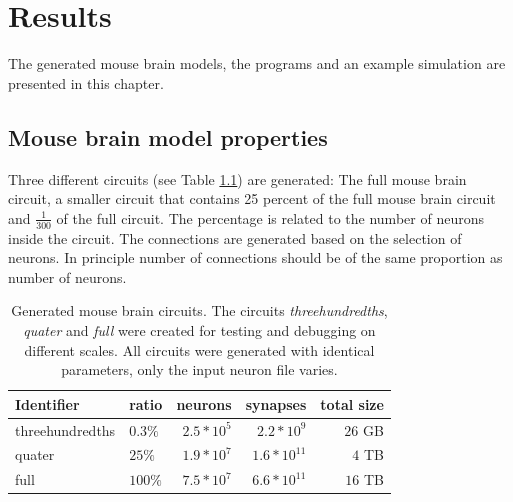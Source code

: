 %



\lstset{escapechar=@,style=customc}


\chapter{Results}

The generated mouse brain models, the programs and an example simulation are presented in this chapter.

\section{Mouse brain model properties}
Three different circuits (see Table \ref{table:circuits}) are generated: The full mouse brain circuit,
a smaller circuit that contains 25 percent of the full mouse brain circuit and
$\frac{1}{300}$ of the full circuit. The percentage is related to the number of neurons inside
the circuit. The connections are generated based on the selection of neurons. In principle
number of connections should be of the same proportion as number of neurons.

\begin{table}[ht!]
\centering
    \begin{tabular}{ | l | l | r | r | r |}
    \hline
    Identifier & ratio & neurons & synapses & total size \\ \hline \hline
    threehundredths & $0.3\%$ & $~2.5*10^5$ & $~2.2*10^9$ & $~26$ GB \\ \hline
    quater & $25\%$ & $~1.9*10^7$ & $~1.6*10^{11}$ & $~4$ TB \\ \hline
    full & $100\%$ & $~7.5*10^7$ & $~6.6*10^{11}$ & $~16$ TB \\ \hline
    \end{tabular}
    \caption[Generated mouse brain circuits]{Generated mouse brain circuits. The circuits \emph{threehundredths}, \emph{quater} and \emph{full} were created for testing and debugging on different scales.
All circuits were generated with identical parameters, only the input neuron file varies.}

\label{table:circuits}
\end{table}


